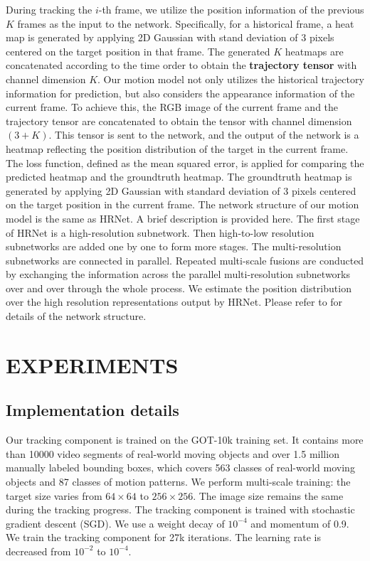 During tracking the $i$-th frame, we utilize the position information of the previous $K$ frames as the input to the network.
Specifically, for a historical frame, a heat map is generated by applying 2D Gaussian with stand deviation of 3 pixels centered on the target position in that frame.
The generated $K$ heatmaps are concatenated according to the time order to obtain the \textbf{trajectory tensor} with channel dimension $K$.
Our motion model not only utilizes the historical trajectory information for prediction, but also considers the appearance information of the current frame.
To achieve this, the RGB image of the current frame and the trajectory tensor are concatenated to obtain the tensor with channel dimension $(3+K)$. This tensor is sent to the network, and the output of the network is a heatmap reflecting the position distribution of the target in the current frame. The loss function, defined as the mean squared error, is applied for comparing the predicted heatmap and the groundtruth heatmap. The groundtruth heatmap is generated by applying 2D Gaussian with standard deviation of 3 pixels centered on the target position in the current frame. The network structure of our motion model is the same as HRNet. 
\fi
A brief description is provided here. The first stage of HRNet is a high-resolution subnetwork. Then high-to-low resolution subnetworks are added one by one to form more stages. The multi-resolution subnetworks are connected in parallel. Repeated multi-scale fusions are conducted by exchanging the information across the parallel multi-resolution subnetworks over and over through the whole process. We estimate the position distribution over the high resolution representations output by HRNet. Please refer to \cite{sun2019deep} for details of the network structure.

\section{EXPERIMENTS}
\label{sec:experiments}

\subsection{Implementation details}
Our tracking component is trained on the GOT-10k \cite{huang2018got} training set. It contains more than 10000 video segments of real-world moving objects and over 1.5 million manually labeled bounding boxes, which covers 563 classes of real-world moving objects and 87 classes of motion patterns.
We perform multi-scale training: the target size varies from $64 \times 64$ to $256 \times 256$. The image size remains the same during the tracking progress. The tracking component is trained with stochastic gradient descent (SGD). We use a weight decay of $10^{-4}$ and momentum of 0.9. We train the tracking component for 27k iterations. The learning rate is decreased from $10^{-2}$ to $10^{-4}$.

